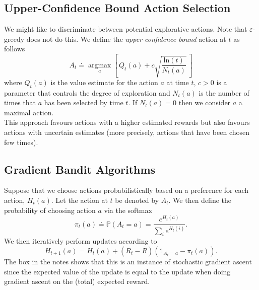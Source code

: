 \documentclass[a4paper, oneside, 11pt]{article}
\newcommand\argmax{\operatorname*{argmax}}
\renewcommand\P{\mathbb{P}}
\begin{document}
\subsection{Upper-Confidence Bound Action Selection}
We might like to discriminate between potential explorative actions. Note that $\varepsilon$-greedy does not do this. We define the \emph{upper-confidence bound} action at $t$ as follows
\begin{equation}
    A_t \doteq \argmax_{a}\left[ \, Q_t(a)+ c \sqrt{\frac{\mathrm{ln}(t)}{N_t(a)}} \, \right]
\end{equation}
where $Q_t(a)$ is the value estimate for the action $a$ at time $t$, $c > 0$ is a parameter that controls the degree of exploration and $N_t(a)$ is the number of times that $a$ has been selected by time $t$. If $N_t(a) = 0$ then we consider $a$ a maximal action.\\

This approach favours actions with a higher estimated rewards but also favours actions with uncertain estimates (more precisely, actions that have been chosen few times).


\subsection{Gradient Bandit Algorithms}
Suppose that we choose actions probabilistically based on a preference for each action, $H_t(a)$. Let the action at $t$ be denoted by $A_t$. We then define the probability of choosing action $a$ via the softmax
\begin{equation}
    \pi_t(a) \doteq \P{}(A_t = a) = \frac{e^{H_t(a)}}{\sum_i e^{H_t(i)}}.
\end{equation}
We then iteratively perform updates according to 
\begin{equation}
    H_{t+1}(a) = H_t(a) + (R_t - \bar{R})(\mathds{1}_{A_t = a} - \pi_t(a)).
\end{equation}
The box in the notes shows that this is an instance of stochastic gradient ascent since the expected value of the update is equal to the update when doing gradient ascent on the (total) expected reward.
\end{document}
